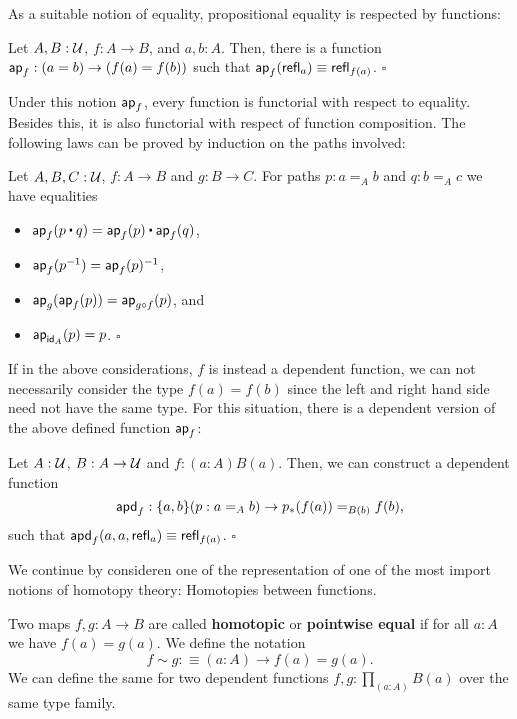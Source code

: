 As a suitable notion of equality, propositional equality is respected by
functions:
\begin{lemma}
Let $A, B : \mathcal{U}$, $f : A \to B$, and $a, b : A$. Then, there is a function
$\mathsf{ap}_f : (a = b) \to (f(a) = f(b))$ such that $\mathsf{ap}_f(\mathsf{refl}_a) \equiv \mathsf{refl}_{f(a)}$.
\hfill $\square$
\end{lemma}

Under this notion $\mathsf{ap}_f$, every function is functorial with respect to
equality.
Besides this, it is also functorial with respect of function composition.
The following laws can be proved by induction on the paths involved:
\begin{lemma}
Let $A, B, C : \mathcal{U}$, $f : A \to B$ and $g : B \to C$. For paths $p : a =_A b$ and
$q : b =_A c$ we have equalities
\begin{itemize}
\item $\ap_f(p \ct q) = \ap_f(p) \ct \ap_f(q)$,
\item $\mathsf{ap}_f(p^{-1}) = \mathsf{ap}_f(p)^{-1}$,
\item $\mathsf{ap}_g(\mathsf{ap}_f(p)) = \mathsf{ap}_{g \circ f}(p)$, and
\item $\mathsf{ap}_{\mathsf{id}_A}(p) = p$. \hfill $\square$
\end{itemize}
\end{lemma}

If in the above considerations, $f$ is instead a dependent function, we can not
necessarily consider the type $f(a) = f(b)$ since the left and right hand side
need not have the same type.
For this situation, there is a dependent version of the above defined function
$\mathsf{ap}_f$:
\begin{lemma}\label{thm:apd-hott}
Let $A : \mathcal{U}$, $B : A \to \mathcal{U}$ and $f : (a : A) B(a)$. Then, we can construct
a dependent function
\begin{equation*}
\mathsf{apd}_f : \{a, b\}(p : a =_A b) \to p_*(f(a)) =_{B(b)} f(b) \text{,}
\end{equation*}
such that $\mathsf{apd}_f(a, a, \mathsf{refl}_a) \equiv \mathsf{refl}_{f(a)}$. \hfill $\square$
\end{lemma}

We continue by consideren one of the representation of one of the most import
notions of homotopy theory:
Homotopies between functions.
\begin{defn}\label{def:tt-htpy}
Two maps $f, g : A \to B$ are called \textbf{homotopic} or \textbf{pointwise equal}
if for all $a : A$ we have
$f(a) = g(a)$.
We define the notation
\begin{equation*}
f \sim g :\equiv (a : A) \to f(a) = g(a) \text{.}
\end{equation*}
We can define the same for two dependent functions $f, g : \prod_{(a : A)} B(a)$
over the same type family.
\end{defn}

